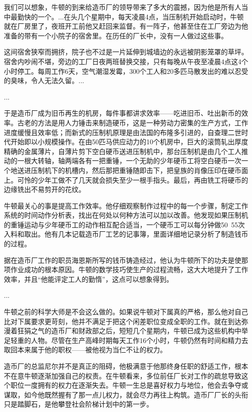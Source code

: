 \documentclass[12pt,oneside]{book}
\begin{document}
\begin{bookref}[frametitle={\cite{牛顿传}}]
我们可以想象，牛顿的到来给造币厂的领导带来了多大的震撼，因为他是所有人当中最勤快的一个。...在头几个星期中，每天凌晨4点，当压制机开始启动时，牛顿就在厂房里了，夜班开工前他又赶回来监督。有一阵子，他甚至住在工厂旁边为他准备的带有一个小院子的宿舍里。在历任的厂长中，没有一人做过这些事。

这间宿舍狭窄而拥挤，院子也不过是一片延伸到城墙边的永远被阴影笼罩的草坪。宿舍内吵闹不堪，旁边的工厂日夜两班替换交接，只有每晚从午夜至凌晨4点这4个小时停工。每周工作6天，空气潮湿发霉，300个工人和20多匹马散发出的难以忍受的臭味，令人无法久留。...

...

于是造币厂成为旧币再生的机房，每件事都讲求效率——吃进旧币、吐出新币的效率。古老的方法是用人力锤击来制造硬币，这是一种劳动力密集的生产方式，工作进度缓慢且效率低；而新式的压制机原理是由法国的布隆多引进的，自查理二世时代开始即以小规模操作。在由50匹马供应动力的10个机房中，巨大的滚筒轧出厚度精确的金属薄片，自薄片剪下空白硬币送进压制机中，那台压制机是由几个工人推动的一根大转轴，轴两端各有一把重锤，一个无助的少年硬币工将空白硬币一次一个地送进压制机下的机槽内，然后那把重锤随即击下，把皇族的肖像压印在硬币面上。可怜的少年工做不了几天就会损失至少一根手指头。最后，再由铣工将硬币的边缘铣出不易剪开的花纹。

牛顿最关心的事是提高工作效率。他仔细观察制作过程中的每一个步骤，制定工作系统的时间动作分析表，找出在何处以何种方法可以加以改善。他发现如果压制机的重锤运动与少年硬币工的动作相互配合适当，一个硬币工可以每分钟做50~55次入料和取出。他有几本记载造币厂工艺的记事簿，里面详细地记录分析了制造钱币的过程。

据在造币厂工作的职员海恩斯所写的钱币铸造经过，他认为牛顿所下的功夫是使那项作业成功的根本原因。牛顿的数学技巧使生产的过程流畅，这大大地提升了工作效率，并且“他能评定工人的勤惰”，这点可以想象得到。

...

牛顿之前的科学大师是不会这么做的。如果说牛顿对下属真的严格，那么他对自己比对下属要求更苛刻，他并不满足于把这个闲差职位变成全职的工作。就在到达弥漫着狂狷之气的造币厂和财政部之后，短短几个星期内，牛顿已成为这些机构中举足轻重的人物。尽管在生产高峰时期每天工作16个小时，牛顿仍然有时间和精力去取回本来属于他的职权——被他视为当仁不让的权力。

造币厂的总监尼尔并不是真正的阻碍，他极满意于他那终身任职的舒适工作，根本不在意牛顿逐渐加强自己的权责。在牛顿看来，多位前任厂长对工作的疏怠导致这个职位一度拥有的权力在逐渐失去。牛顿一生总是喜好权力与地位，他会去争夺或谋取，如今他既然握有了那一点儿权力，就会尽力再往上构筑。造币厂厂长的头衔只是踏脚石，是他攀登社会阶梯计划中的第一步。


\end{bookref}
\end{document}
